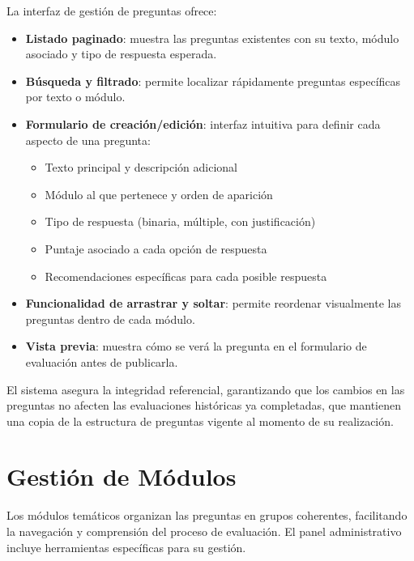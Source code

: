 \documentclass[12pt,a4paper]{report}
\begin{document}
La interfaz de gestión de preguntas ofrece:
\begin{itemize}[leftmargin=*]
    \item \textbf{Listado paginado}: muestra las preguntas existentes con su texto, módulo asociado y tipo de respuesta esperada.
    \item \textbf{Búsqueda y filtrado}: permite localizar rápidamente preguntas específicas por texto o módulo.
    \item \textbf{Formulario de creación/edición}: interfaz intuitiva para definir cada aspecto de una pregunta:
    \begin{itemize}
        \item Texto principal y descripción adicional
        \item Módulo al que pertenece y orden de aparición
        \item Tipo de respuesta (binaria, múltiple, con justificación)
        \item Puntaje asociado a cada opción de respuesta
        \item Recomendaciones específicas para cada posible respuesta
    \end{itemize}
    \item \textbf{Funcionalidad de arrastrar y soltar}: permite reordenar visualmente las preguntas dentro de cada módulo.
    \item \textbf{Vista previa}: muestra cómo se verá la pregunta en el formulario de evaluación antes de publicarla.
\end{itemize}

El sistema asegura la integridad referencial, garantizando que los cambios en las preguntas no afecten las evaluaciones históricas ya completadas, que mantienen una copia de la estructura de preguntas vigente al momento de su realización.

\section{Gestión de Módulos}
Los módulos temáticos organizan las preguntas en grupos coherentes, facilitando la navegación y comprensión del proceso de evaluación. El panel administrativo incluye herramientas específicas para su gestión.
\end{document}
